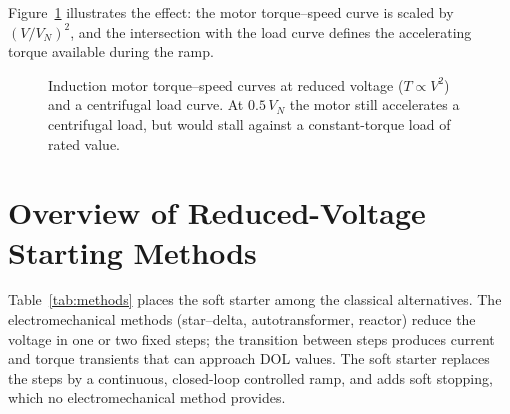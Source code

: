 \documentclass[11pt,a4paper]{article}
\begin{document}
Figure~\ref{fig:torquespeed} illustrates the effect: the motor torque--speed
curve is scaled by $(V/V_N)^2$, and the intersection with the load curve
defines the accelerating torque available during the ramp.

\begin{figure}[htb]
\centering
{}
\caption{Induction motor torque--speed curves at reduced voltage
($T \propto V^2$) and a centrifugal load curve. At $0.5\,V_N$ the motor
still accelerates a centrifugal load, but would stall against a
constant-torque load of rated value.}
\label{fig:torquespeed}
\end{figure}

\section{Overview of Reduced-Voltage Starting Methods}

Table~\ref{tab:methods} places the soft starter among the classical
alternatives. The electromechanical methods (star--delta, autotransformer,
reactor) reduce the voltage in one or two fixed steps; the transition
between steps produces current and torque transients that can approach DOL
values. The soft starter replaces the steps by a continuous, closed-loop
controlled ramp, and adds soft stopping, which no electromechanical method
provides.
\end{document}
